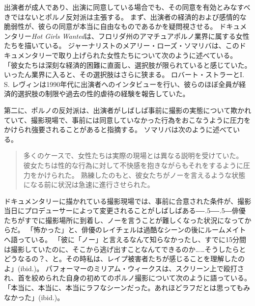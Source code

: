 \documentclass[paper=a4,book,openany]{jlreq}
\def\DDASH{―\kern-.5\zw―\kern-.5\zw―} %
\begin{document}
出演者が成人であり、出演に同意している場合でも、その同意を有効とみなすべきではないとポルノ反対派は主張する。
まず、出演者の経済的および感情的な脆弱性が、彼らの同意が本当に自由なものであるかを疑問視させる。
ドキュメンタリー\emph{Hot Girls Wanted}は、フロリダ州のアマチュアポルノ業界に属する女性たちを描いている。
ジャーナリストのメアリー・ローズ・ソマリバは、このドキュメンタリーで取り上げられた女性たちについて次のように述べている。
「彼女たちは深刻な経済的困難に直面し、選択肢が限られていると感じていた。
いったん業界に入ると、その選択肢はさらに狭まる\citep{somarriba15:_porn_indus_is_abusiv_these}。
ロバート・ストラーとI. S. レヴィンは1990年代に出演者へのインタビューを行い、彼らのほぼ全員が経済的選択肢の制限や過去の性的虐待の経験を報告していた\citep{stoller93:_comin_attrac}。

第二に、ポルノの反対派は、出演者がしばしば事前に撮影の実態について欺かれていて、撮影現場で、事前には同意していなかった行為をおこなうように圧力をかけられ強要されることがあると指摘する。
ソマリバは次のように述べている。

\begin{quote}
多くのケースで、女性たちは実際の現場とは異なる説明を受けていた。
彼女たちは性的な行為に対して不快感を抱きながらもそれをするように圧力をかけられた。
熟練したのもと、彼女たちがノーを言えるような状態になる前に状況は急速に進行させられた。
\citep{somarriba15:_porn_indus_is_abusiv_these}
\end{quote}

ドキュメンタリーに描かれている撮影現場では、事前に合意された条件が、撮影当日にプロデューサーによって変更されることがしばしばある{\DDASH}俳優たちがすでに撮影場所に到着し、ノーを言うことが難しくなった状況になってからだ。
「怖かった」と、俳優のレイチェルは過酷なシーンの後にルームメイトへ語っている。
「彼に「ノー」と言えるなんて知らなかったし、すでに15分間は撮影していたのに、そこから逃げ出すことなんてできるのか……そうしたらとどうなるの？、と。その時私は、レイプ被害者たちが感じることを理解したのよ」(ibid.)。
パフォーマーのミリアム・ウィークスは、スクリーン上で殴打され、首を絞められた自身の初めてのポルノ撮影について次のように語っている。
「本当に、本当に、本当にラフなシーンだった。あれほどラフだとは思ってもみなかった」(ibid.)。
\end{document}

